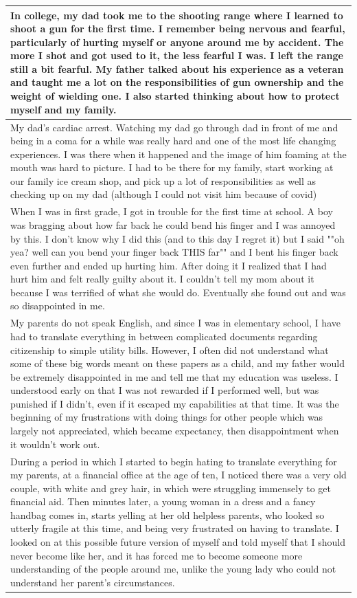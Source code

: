 \documentclass[
  .7em,
  letterpaper,
  DIV=11,
  numbers=noendperiod]{scrartcl}
\begin{document}
\begin{table}
\begin{tabular}{l}
\hline
In college, my dad took me to the shooting range where I learned to shoot a gun for the first time. I remember being nervous and fearful, particularly of hurting myself or anyone around me by accident. The more I shot and got used to it, the less fearful I was. I left the range still a bit fearful. My father talked about his experience as a veteran and taught me a lot on the responsibilities of gun ownership and the weight of wielding one. I also started thinking about how to protect myself and my family.\\
\hline
My dad's cardiac arrest. Watching my dad go through dad in front of me and being in a coma for a while was really hard and one of the most life changing experiences. I was there when it happened and the image of him foaming at the mouth was hard to picture. I had to be there for my family, start working at our family ice cream shop, and pick up a lot of responsibilities as well as checking up on my dad (although I could not visit him because of covid)\\
\hline
When I was in first grade, I got in trouble for the first time at school. A boy was bragging about how far back he could bend his finger and I was annoyed by this. I don't know why I did this (and to this day I regret it) but I said ""oh yea? well can you bend your finger back THIS far"" and I bent his finger back even further and ended up hurting him. After doing it I realized that I had hurt him and felt really guilty about it. I couldn't tell my mom about it because I was terrified of what she would do. Eventually she found out and was so disappointed in me.\\
\hline
My parents do not speak English, and since I was in elementary school, I have had to translate everything in between complicated documents regarding citizenship to simple utility bills. However, I often did not understand what some of these big words meant on these papers as a child, and my father would be extremely disappointed in me and tell me that my education was useless. I understood early on that I was not rewarded if I performed well, but was punished if I didn't, even if it escaped my capabilities at that time. It was the beginning of my frustrations with doing things for other people which was largely not appreciated, which became expectancy, then disappointment when it wouldn't work out.\\
\hline
During a period in which I started to begin hating to translate everything for my parents, at a financial office at the age of ten, I noticed there was a very old couple, with white and grey hair, in which were struggling immensely to get financial aid. Then minutes later, a young woman in a dress and a fancy handbag comes in, starts yelling at her old helpless parents, who looked so utterly fragile at this time, and being very frustrated on having to translate. I looked on at this possible future version of myself and told myself that I should never become like her, and it has forced me to become someone more understanding of the people around me, unlike the young lady who could not understand her parent's circumstances.\\

\end{tabular}
\end{table}
\end{document}
